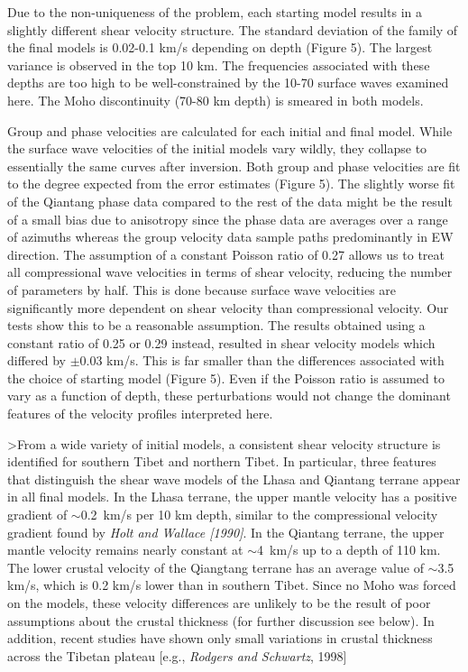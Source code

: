 \documentclass[12pt]{article}
\begin{document}
Due to the non-uniqueness of the problem, each starting model results in a slightly different shear
velocity structure.  The standard deviation of the family of the final models is 0.02-0.1 km/s depending on
depth (Figure 5).  The largest variance is observed in the top 10 km.  The frequencies associated with
these depths are too high to be well-constrained by the 10-70 surface waves examined here. The Moho discontinuity (70-80 km depth) is smeared in both models.

Group and phase velocities are calculated for each initial and final model.  While the surface wave
velocities of the initial models vary wildly, they collapse to essentially the same curves after inversion.
Both group and phase velocities are fit to the degree expected from the error
  estimates (Figure 5).   The slightly worse fit of the Qiantang phase data
  compared to the rest of the data might be the result of a small bias due to
  anisotropy since the phase data are averages over a range of azimuths whereas the
  group velocity data sample paths predominantly in EW direction.
The assumption of a constant Poisson ratio of 0.27 allows us to treat all compressional wave velocities in
terms of shear velocity, reducing the number of parameters by half. This is done because surface wave
velocities are significantly more dependent on shear velocity than compressional velocity.  Our tests show
this to be a reasonable assumption.  The results obtained using a constant ratio of 0.25 or 0.29 instead,
resulted in shear velocity models which differed by $\pm$0.03 km/s.  This is far smaller than the differences
associated with the choice of starting model (Figure 5).  Even if the Poisson ratio is assumed to vary as a
function of depth, these perturbations would not change the dominant features of the
velocity profiles interpreted here.

>From a wide variety of initial models, a consistent shear velocity structure is identified for southern
Tibet and northern Tibet. In particular, three features that distinguish the shear wave models of the Lhasa and Qiantang terrane appear in all final models.
In the Lhasa terrane, the upper mantle velocity has a positive gradient of $\sim$0.2~km/s per 10 km depth,
similar to the compressional velocity gradient found by {\it Holt and Wallace [1990]}.  In the Qiantang terrane,
the upper mantle velocity remains nearly constant at $\sim$4~km/s up to a depth of 110 km. The lower crustal
velocity of the Qiangtang terrane has an average value of $\sim$3.5 km/s, which is 0.2 km/s lower than in
southern Tibet.  Since no Moho was forced on the models, these velocity differences are       unlikely to be the
result of poor assumptions about the crustal thickness (for further
discussion see below).  In addition, recent studies have shown only small variations
in crustal thickness across the Tibetan plateau [e.g., {\it Rodgers and Schwartz}, 1998]
\end{document}
